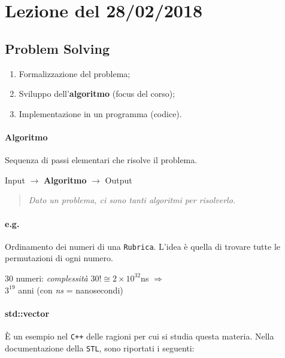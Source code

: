 \section{Lezione del 28/02/2018}

\subsection{Problem Solving}
\begin{enumerate}
	\item Formalizzazione del problema;
	\item Sviluppo dell'\textbf{algoritmo} (focus del corso);
	\item Implementazione in un programma (codice).
\end{enumerate}

\paragraph{Algoritmo} Sequenza di passi elementari che risolve il problema.\par

\begin{center}
	Input $\rightarrow$ \textbf{Algoritmo} $\rightarrow$ Output
\end{center}

\begin{quote} 
	\textit{Dato un problema, ci sono tanti algoritmi per risolverlo.}
\end{quote}

\paragraph{e.g.} Ordinamento dei numeri di una \texttt{Rubrica}.
L'idea è quella di trovare tutte le permutazioni di ogni numero.\par

\begin{center}
	30 numeri: \textit{complessità} $30! \cong 2 \times 10^{32}$ns $\Rightarrow$ \\
	$3^{19}$ anni (con \textit{ns} = nanosecondi)
\end{center}

\paragraph{std::vector} È un esempio nel \texttt{C++} delle ragioni per cui si studia questa materia. Nella documentazione della \texttt{STL}, sono riportati i seguenti:

